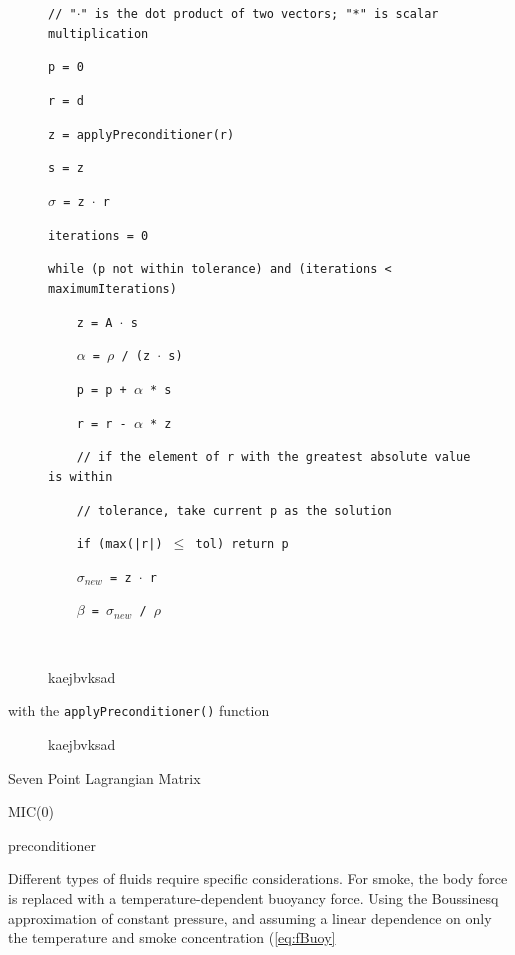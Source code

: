 \documentclass[12pt]{article}
\begin{document}
\begin{figure}[h]
\begin{framed}
\texttt{// "$\cdot$" is the dot product of two vectors; "*" is scalar multiplication}

\texttt{p = 0}

\texttt{r = d}

\texttt{z = applyPreconditioner(r)}

\texttt{s = z}

\texttt{$\sigma$ = z $\cdot$ r}

\texttt{iterations = 0}

\texttt{while (p not within tolerance) and (iterations < maximumIterations)}

\texttt{~~~~z = A $\cdot$ s}

\texttt{~~~~$\alpha$ = $\rho$ / (z $\cdot$ s)}

\texttt{~~~~p = p + $\alpha$ * s}

\texttt{~~~~r = r - $\alpha$ * z}

\texttt{~~~~// if the element of r with the greatest absolute value is within}

\texttt{~~~~// tolerance, take current p as the solution}

\texttt{~~~~if (max(|r|) $\leq$ tol) return p}

\texttt{~~~~$\sigma_{new}$ = z $\cdot$ r}

\texttt{~~~~$\beta$ = $\sigma_{new}$ / $\rho$}

\texttt{~~~~}
\end{framed}
\centering
\vspace*{-3mm}\caption{kaejbvksad}
\label{fig:PCG}
\end{figure}

with the \texttt{applyPreconditioner()} function

\begin{figure}[h]
\begin{framed}
\texttt{}

\texttt{}

\texttt{}
\end{framed}
\centering
\vspace*{-3mm}\caption{kaejbvksad}
\label{fig:precond}
\end{figure}

Seven Point Lagrangian Matrix

MIC(0)

preconditioner

Different types of fluids require specific considerations. For smoke, the body force is replaced with a temperature-dependent buoyancy force. Using the Boussinesq approximation of constant pressure, and assuming a linear dependence on only the temperature and smoke concentration  (\ref{eq:fBuoy}
\end{document}
